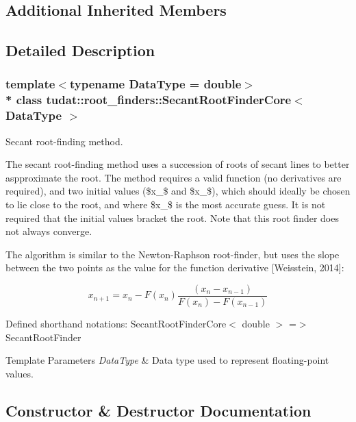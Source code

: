 \subsection*{Additional Inherited Members}


\subsection{Detailed Description}
\subsubsection*{template$<$typename Data\+Type = double$>$\\*
class tudat\+::root\+\_\+finders\+::\+Secant\+Root\+Finder\+Core$<$ Data\+Type $>$}

Secant root-\/finding method. 

The secant root-\/finding method uses a succession of roots of secant lines to better aspproximate the root. The method requires a valid function (no derivatives are required), and two initial values (\$x\+\_\$ and \$x\+\_\$), which should ideally be chosen to lie close to the root, and where \$x\+\_\$ is the most accurate guess. It is not required that the initial values bracket the root. Note that this root finder does not always converge.

The algorithm is similar to the Newton-\/\+Raphson root-\/finder, but uses the slope between the two points as the value for the function derivative \mbox{[}Weisstein, 2014\mbox{]}\+:

\[ x_{n+1} = x_n - F\left(x_n\right) \frac{\left(x_n - x_{n-1}\right)} {F\left(x_n\right) - F\left(x_{n-1}\right)} \]

Defined shorthand notations\+: Secant\+Root\+Finder\+Core$<$ double $>$ =$>$ Secant\+Root\+Finder


\begin{DoxyTemplParams}{Template Parameters}
{\em Data\+Type} & Data type used to represent floating-\/point values. \\
\hline
\end{DoxyTemplParams}


\subsection{Constructor \& Destructor Documentation}
